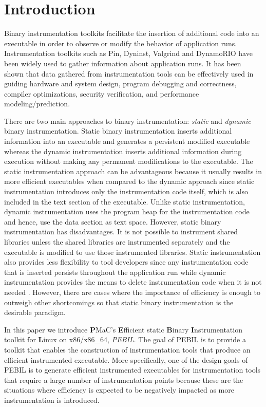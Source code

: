 \section{Introduction}
\label{sec:Introduction}

Binary instrumentation toolkits facilitate the insertion of additional code into an
executable in order to observe or modify the behavior of application runs. 
Instrumentation toolkits such as Pin\cite{luk2005pin}, Dyninst\cite{buck2000api}, 
Valgrind\cite{nethercote2007valgrind} and DynamoRIO\cite{bruening2004efficient} have been widely used to gather information about
application runs. It has been shown that data gathered 
from instrumentation tools can be effectively used in guiding hardware and
system design, program debugging and correctness, compiler optimizations, security verification,
and performance modeling/prediction\cite{snavely2001modeling}.

There are two main approaches to binary instrumentation: \textit{static} 
and \textit{dynamic} binary instrumentation. Static binary
instrumentation inserts additional information into an executable and generates a persistent
modified executable whereas the dynamic instrumentation inserts additional information 
during execution without making any permanent modifications to the executable.
The static instrumentation approach can be advantageous because it usually results in more
efficient executables when compared to the dynamic approach
since static instrumentation introduces only the instrumentation code itself, 
which is also included in the text section of the executable. 
Unlike static instrumentation, dynamic
instrumentation uses the program heap for the instrumentation code and hence, use the data section as text space.
However, static binary instrumentation has disadvantages. It is not possible to instrument shared libraries 
unless the shared libraries are instrumented separately and the executable is modified to use those instrumented libraries. 
Static instrumentation also provides less flexibility to tool developers since any instrumentation code that is
inserted persists throughout the application run while dynamic instrumentation 
provides the means to delete instrumentation code when it is not needed \cite{tikir2002efficient}.
However, there are cases where the importance of efficiency is enough to outweigh
other shortcomings \cite{carrington2006performance} so that static binary instrumentation is the
desirable paradigm. 

In this paper we introduce \textbf{P}MaC's \textbf{E}fficient static \textbf{B}inary \textbf{I}nstrumentation 
toolkit for \textbf{L}inux on x86/x86\_64, \textit{PEBIL}. The goal of PEBIL is to provide a toolkit that enables the construction of
instrumentation tools that produce an efficient instrumented
executable. More specifically, one of the design goals of PEBIL is to generate efficient instrumented executables
for instrumentation tools that require a large number of instrumentation points because these are the situations 
where efficiency is expected to be negatively impacted as more instrumentation is introduced. 

